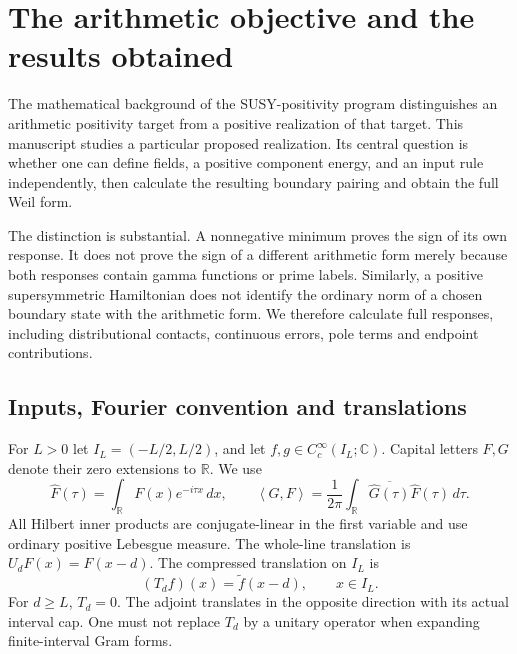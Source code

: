 \documentclass[11pt]{article}
\numberwithin{equation}{section}
\theoremstyle{definition}
\theoremstyle{remark}
\newcommand{\R}{\mathbb R}
\newcommand{\C}{\mathbb C}
\newcommand{\ip}[2]{\left\langle#1,#2\right\rangle}
\begin{document}
\section{The arithmetic objective and the results obtained}
\label{sec:objective}
The mathematical background of the SUSY-positivity program \cite{background} distinguishes an arithmetic positivity target from a positive realization of that target. This manuscript studies a particular proposed realization. Its central question is whether one can define fields, a positive component energy, and an input rule independently, then calculate the resulting boundary pairing and obtain the full Weil form.

The distinction is substantial. A nonnegative minimum proves the sign of its own response. It does not prove the sign of a different arithmetic form merely because both responses contain gamma functions or prime labels. Similarly, a positive supersymmetric Hamiltonian does not identify the ordinary norm of a chosen boundary state with the arithmetic form. We therefore calculate full responses, including distributional contacts, continuous errors, pole terms and endpoint contributions.

\subsection{Inputs, Fourier convention and translations}
For $L>0$ let $I_L=(-L/2,L/2)$, and let $f,g\in C_c^\infty(I_L;\C)$. Capital letters $F,G$ denote their zero extensions to $\R$. We use
\begin{equation}
\widehat F(\tau)=\int_\R F(x)e^{-i\tau x}\,dx,
\qquad
\ip{G}{F}=\frac1{2\pi}\int_\R
\overline{\widehat G(\tau)}\widehat F(\tau)\,d\tau.
\end{equation}
All Hilbert inner products are conjugate-linear in the first variable and use ordinary positive Lebesgue measure. The whole-line translation is $U_dF(x)=F(x-d)$. The compressed translation on $I_L$ is
\begin{equation}
(T_df)(x)=\widetilde f(x-d),\qquad x\in I_L.
\end{equation}
For $d\ge L$, $T_d=0$. The adjoint translates in the opposite direction with its actual interval cap. One must not replace $T_d$ by a unitary operator when expanding finite-interval Gram forms.
\end{document}
